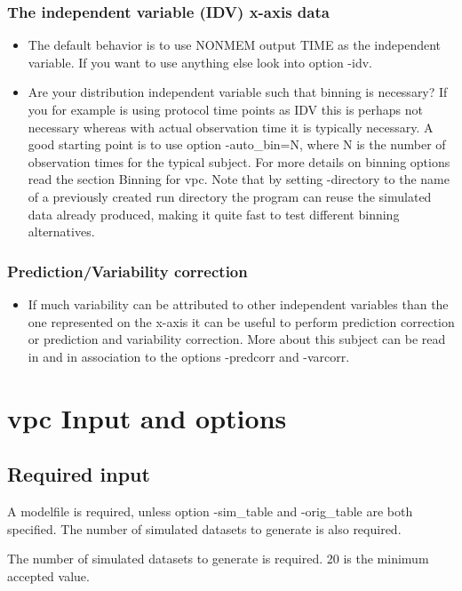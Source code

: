 \subsubsection*{The independent variable (IDV) x-axis data}

\begin{itemize}
\item The default behavior is to use NONMEM output TIME as the independent variable. If you want to use anything else look into option -idv.
\item Are your distribution independent variable such that binning is necessary? If you for example is using protocol time points as IDV this is perhaps not necessary whereas with actual observation time it is typically necessary. A good starting point is to use option -auto\_bin=N, where N is the number of observation times for the typical subject. For more details on binning options read the section Binning for vpc. Note that by setting -directory to the name of a previously created run directory the program can reuse the simulated data already produced, making it quite fast to test different binning alternatives.
\end{itemize}

\subsubsection*{Prediction/Variability correction}

\begin{itemize}
	\item If much variability can be attributed to other independent variables than the one represented on the x-axis it can be useful to perform prediction correction or prediction and variability correction. More about this subject can be read in \cite{Bergstrand} and in association to the options -predcorr and -varcorr.
\end{itemize}

\section{vpc Input and options}
\subsection{Required input}
A modelfile is required, unless option -sim\_table and -orig\_table are both specified. 
The number of simulated datasets to generate is also required.
\begin{optionlist}
The number of simulated datasets to generate is required. 20 is the minimum accepted value. 
\nextopt
\end{optionlist}

